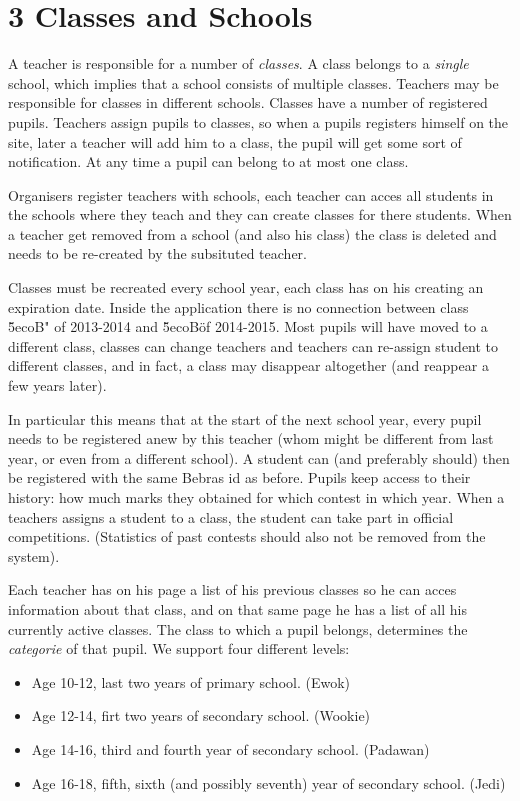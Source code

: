
\section*{3 Classes and Schools}

A teacher is responsible for a number of \emph{classes}. A class belongs to a \emph{single} school, which implies that a school consists of multiple classes. Teachers may be responsible for classes in different schools. Classes have a number of registered pupils. Teachers assign pupils to classes, so when a pupils registers himself on the site, later a teacher will add him to a class, the pupil will get some sort of notification. At any time a pupil can belong to at most one class. 

Organisers register teachers with schools, each teacher can acces all students in the schools where they teach and they can create classes for there students.
When a teacher get removed from a school (and also his class) the class is deleted and needs to be re-created by the subsituted teacher.

Classes must be recreated every school year, each class has on his creating an expiration date. Inside the application there is no connection between class \"5ecoB" of 2013-2014 and \"5ecoB\" of 2014-2015. Most pupils will have moved to a different class, classes can change teachers and teachers can re-assign student to different classes, and in fact, a class may disappear altogether (and reappear a few years later).

In particular this means that at the start of the next school year, every pupil needs to be registered anew by this teacher (whom might be different from last year, or even from a different school). A student can (and preferably should) then be registered with the same Bebras id as before. Pupils keep access to their history: how much marks they obtained for which contest in which year. 
When a teachers assigns a student to a class, the student can take part in official competitions.
(Statistics of past contests should also not be removed from the system).

Each teacher has on his page a list of his previous classes so he can acces information about that class, and on that same page he has a list of all his currently active classes. 
The class to which a pupil belongs, determines the \emph{categorie} of that pupil. We support four different levels:
\begin{itemize}
\item Age 10-12, last two years of primary school. (Ewok)
\item Age 12-14, firt two years of secondary school. (Wookie)
\item Age 14-16, third and fourth year of secondary school. (Padawan)
\item Age 16-18, fifth, sixth (and possibly seventh) year of secondary school. (Jedi)
\end{itemize}

